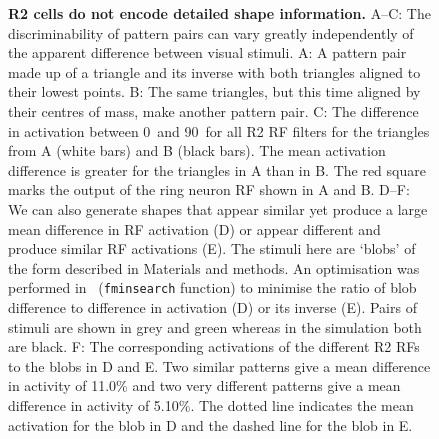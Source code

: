 \begin{figure}[htp]
	\caption{
		{\bf R2 cells do not encode detailed shape information.}
		A--C: The discriminability of pattern pairs can vary greatly independently of the apparent difference between visual stimuli.
		A: A pattern pair made up of a triangle and its inverse with both triangles aligned to their lowest points.
		B: The same triangles, but this time aligned by their centres of mass, make another pattern pair.
		C: The difference in activation between 0\degree\ and 90\degree\ for all R2 RF filters for the triangles from A (white bars) and B (black bars). The mean activation difference is greater for the triangles in A than in B. The red square marks the output of the ring neuron \ac{RF} shown in A and B. 
		D--F: We can also generate shapes that appear similar yet produce a large mean difference in RF activation (D) or appear different and produce similar RF activations (E). The stimuli here are `blobs' of the form described in Materials and methods. An optimisation was performed in \Matlab\ (\texttt{fminsearch} function) to minimise the ratio of blob difference to difference in activation (D) or its inverse (E). Pairs of stimuli are shown in grey and green whereas in the simulation both are black.
		F: The corresponding activations of the different R2 RFs to the blobs in D and E. Two similar patterns give a mean difference in activity of 11.0\% and two very different patterns give a mean difference in activity of 5.10\%. The dotted line indicates the mean activation for the blob in D and the dashed line for the blob in E.
	}
	\label{fig:simdiffpatts}
\end{figure}


